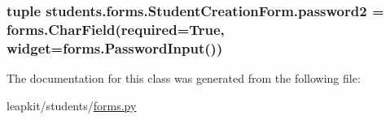 \hypertarget{classstudents_1_1forms_1_1_student_creation_form_a80b36a4c23794bf568774c3fd915351b}{
\subsubsection[{password2}]{\setlength{\rightskip}{0pt plus 5cm}tuple students.\-forms.\-Student\-Creation\-Form.\-password2 = forms.\-Char\-Field(required=True, widget=forms.\-Password\-Input())\hspace{0.3cm}{\ttfamily [static]}}}\label{classstudents_1_1forms_1_1_student_creation_form_a80b36a4c23794bf568774c3fd915351b}


The documentation for this class was generated from the following file\-:\begin{DoxyCompactItemize}
\item 
leapkit/students/\hyperlink{forms_8py}{forms.\-py}\end{DoxyCompactItemize}
